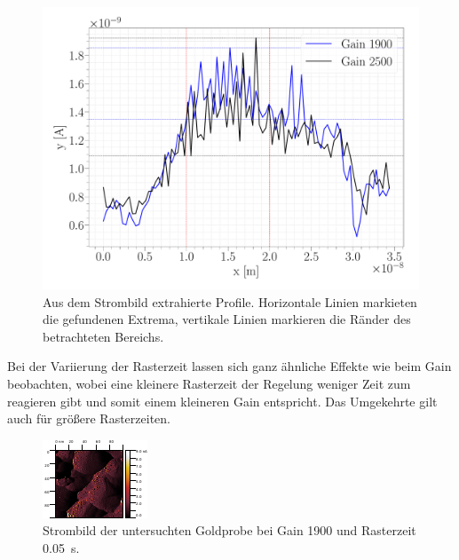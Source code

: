 \begin{figure}[H]
\centering
\includegraphics[width=\textwidth]{../Figures/GAIN_I_forward_profiles.pdf}
\caption{Aus dem Strombild extrahierte Profile. Horizontale Linien markieten die gefundenen Extrema, vertikale Linien markieren die Ränder des betrachteten Bereichs.}
\label{GAIN_I_forward_profiles}
\end{figure}

Bei der Variierung der Rasterzeit lassen sich ganz ähnliche Effekte wie beim Gain beobachten, wobei eine kleinere Rasterzeit der Regelung weniger Zeit zum reagieren gibt und somit einem kleineren Gain entspricht. Das Umgekehrte gilt auch für größere Rasterzeiten.

\begin{figure}[H]
\centering
\includegraphics[width=\textwidth]{../Gwyddion/Gold/TIME_005_I_forward.pdf}
\caption{Strombild der untersuchten Goldprobe bei Gain 1900 und Rasterzeit \SI{0.05}{s}.}
\label{TIME_005_I}
\end{figure}

